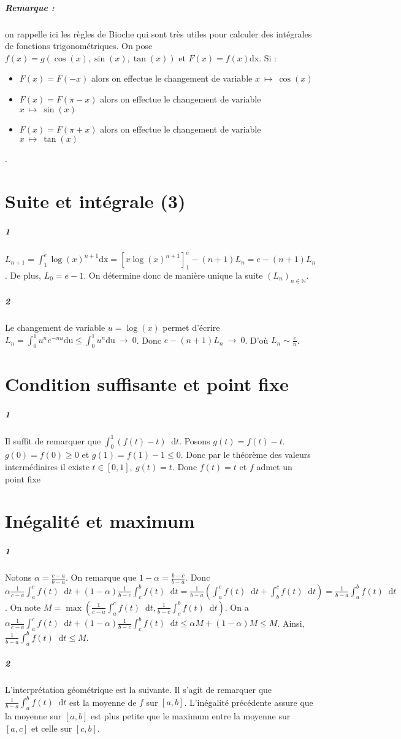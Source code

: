 \documentclass[10pt,a4paper]{article}
\newcommand{\intt}[4]{\int_{#1}^{#2} #3 \mathop{}\!\mathrm{d} #4}
\begin{document}
\subparagraph{Remarque :} on rappelle ici les règles de Bioche qui sont très utiles pour calculer des intégrales de fonctions trigonométriques.
On pose $f(x) = g(\cos(x), \sin(x), \tan(x))$ et $F(x) = f(x) \text{dx}$. Si :
\begin{itemize}
\item $F(x) = F(-x)$ alors on effectue le changement de variable $x \ \mapsto \ \cos(x)$
\item $F(x) = F(\pi-x)$ alors on effectue le changement de variable $x \ \mapsto \ \sin(x)$
\item $F(x) = F(\pi+x)$ alors on effectue le changement de variable $x \ \mapsto \ \tan(x)$
\end{itemize}.
\section{Suite et intégrale (3)}

\subparagraph{1}$L_{n+1} = \int_1^e \log(x)^{n+1} \text{dx} = [x \log(x)^{n+1}]_1^e - (n+1)L_n = e - (n+1)L_n$. De plus, $L_0 = e-1$. On détermine donc de manière unique la suite $(L_n)_{n \in \mathbb{N}}$.
\subparagraph{2}Le changement de variable $u = \log(x)$ permet d'écrire $L_n = \int_0^1 u^n e^{-nu} \text{du} \le \int_0^1 u^n \text{du} \ \longrightarrow \ 0$. Donc ${e - (n+1)L_n \ \longrightarrow \ 0}$. D'où $L_n \sim \frac{e}{n}$.
\section{Condition suffisante et point fixe}
\subparagraph{1} Il suffit de remarquer que $\intt{0}{1}{(f(t)-t)}{t}$. Posons $g(t) = f(t) -t$. $g(0) = f(0) \ge 0$ et $g(1) = f(1) - 1 \le 0$. Donc par le théorème des valeurs intermédiaires il existe $t \in [0,1], \ g(t) = t$. Donc $f(t) = t$ et $f$ admet un point fixe
\section{Inégalité et maximum}
\subparagraph{1}
Notons $\alpha = \frac{c-a}{b-a}$. On remarque que $1 - \alpha = \frac{b-c}{b-a}$. Donc $\alpha \frac{1}{c-a} \intt{a}{c}{f(t)}{t} + (1- \alpha) \frac{1}{b-c}\intt{c}{b}{f(t)}{t} = \frac{1}{b-a}\left(\intt{a}{c}{f(t)}{t} + \intt{b}{c}{f(t)}{t} \right) = \frac{1}{b-a} \intt{a}{b}{f(t)}{t}$. On note $M = \max \left( \frac{1}{c-a} \intt{a}{c}{f(t)}{t},  \frac{1}{b-c}\intt{c}{b}{f(t)}{t} \right)$. On a $\alpha \frac{1}{c-a} \intt{a}{c}{f(t)}{t} + (1- \alpha) \frac{1}{b-c}\intt{c}{b}{f(t)}{t} \le \alpha M + (1-\alpha) M \le M$. Ainsi, $\frac{1}{b-a} \intt{a}{b}{f(t)}{t} \le M$.
\subparagraph{2}L'interprétation géométrique est la suivante. Il s'agit de remarquer que $\frac{1}{b-a} \intt{a}{b}{f(t)}{t}$ est la moyenne de $f$ sur $[a,b]$. L'inégalité précédente assure que la moyenne sur $[a,b]$ est plus petite que le maximum entre la moyenne sur $[a,c]$ et celle sur $[c,b]$.
\end{document}
